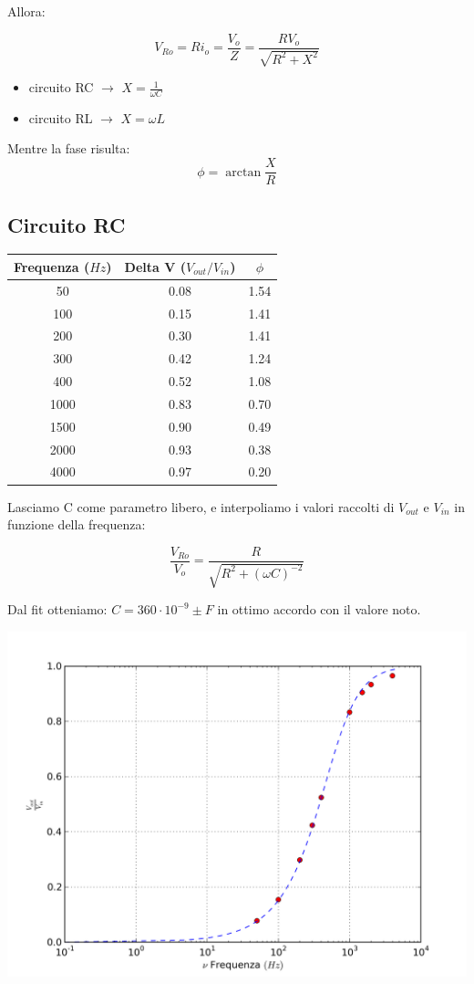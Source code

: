 Allora: 

$$V_{Ro} = Ri_o = \frac{V_o}{Z} = \frac{RV_o}{\sqrt{R^2+X^2}} $$ 


\begin{itemize}
\item circuito RC $\rightarrow$ $X=\frac{1}{\omega C}$
\item circuito RL $\rightarrow$ $X=\omega L$
\end{itemize}

Mentre la fase risulta: 
$$\phi = \arctan \frac{X}{R} $$


\subsection{Circuito RC}


\begin{center}

\begin{tabular}{*{3}{c}}
Frequenza ($Hz$) & Delta V ($V_{out}/V_{in}$) & $\phi$ \\
\midrule
50 & 0.08 & 1.54\\
100 & 0.15 & 1.41\\
200 & 0.30 & 1.41\\
300 & 0.42 & 1.24\\
400 & 0.52 & 1.08 \\
1000 & 0.83 & 0.70\\
1500 & 0.90 & 0.49\\
2000 & 0.93 & 0.38\\
4000 & 0.97 & 0.20 \\
\end{tabular}
\end{center}

Lasciamo C come parametro libero, e interpoliamo i valori raccolti di $V_{out}$ e $V_{in}$ in funzione della frequenza:

$$\frac{V_{Ro}}{V_o} = \frac{R}{\sqrt{R^2+(\omega C)^{-2}}}$$

Dal fit otteniamo: $C=360 \cdot 10^{-9} \pm  F $ in ottimo accordo con il valore noto.

\begin{center}
 \includegraphics[scale=0.70]{grafici/C3/ddpcond.png}
\end{center}

